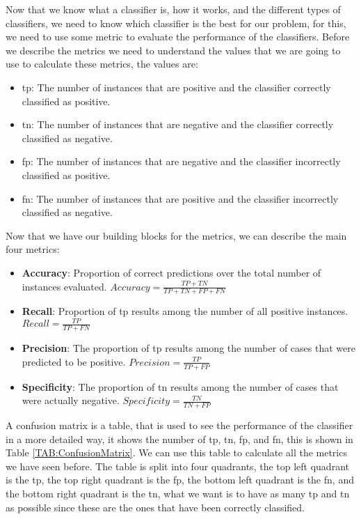Now that we know what a classifier is, how it works, and the different types of classifiers, we need to know which classifier is the best for our problem, for this, we need to use some metric to evaluate the performance of the classifiers. Before we describe the metrics we need to understand the values that we are going to use to calculate these metrics, the values are:


\begin{itemize}
    \item \ac{tp}: The number of instances that are positive and the classifier correctly classified as positive.
    \item \ac{tn}: The number of instances that are negative and the classifier correctly classified as negative.
    \item \ac{fp}: The number of instances that are negative and the classifier incorrectly classified as positive.
    \item \ac{fn}: The number of instances that are positive and the classifier incorrectly classified as negative.
\end{itemize}

Now that we have our building blocks for the metrics, we can describe the main four metrics:


\begin{itemize}
    \item \textbf{Accuracy}: Proportion of correct predictions over the total number of instances evaluated. $Accuracy = \frac{TP + TN}{TP + TN + FP + FN}$
    \item \textbf{Recall}: Proportion of \ac{tp} results among the number of all positive instances. $Recall = \frac{TP}{TP + FN}$
    \item \textbf{Precision}: The proportion of \ac{tp} results among the number of cases that were predicted to be positive. $Precision = \frac{TP}{TP + FP}$
    \item \textbf{Specificity}: The proportion of \ac{tn} results among the number of cases that were actually negative. $Specificity = \frac{TN}{TN + FP}$
\end{itemize}

A confusion matrix is a table, that is used to see the performance of the classifier in a more detailed way, it shows the number of \ac{tp}, \ac{tn}, \ac{fp}, and \ac{fn}, this is shown in Table \ref{TAB:ConfusionMatrix}. We can use this table to calculate all the metrics we have seen before. The table is split into four quadrants, the top left quadrant is the \ac{tp}, the top right quadrant is the \ac{fp}, the bottom left quadrant is the \ac{fn}, and the bottom right quadrant is the \ac{tn}, what we want is to have as many \ac{tp} and \ac{tn} as possible since these are the ones that have been correctly classified.

